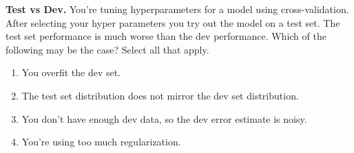 \item{}
\textbf{Test vs Dev.}
You’re tuning hyperparameters for a model using cross-validation. After selecting your hyper parameters you try out the model on a test set. The test set performance is much worse than the dev performance. Which of the following may be the case? Select all that apply.

\begin{enumerate}[label=(\alph*)]
    \item You overfit the dev set.
    \item The test set distribution does not mirror the dev set distribution.
    \item You don’t have enough dev data, so the dev error estimate is noisy.
    \item You’re using too much regularization.
\end{enumerate} 
